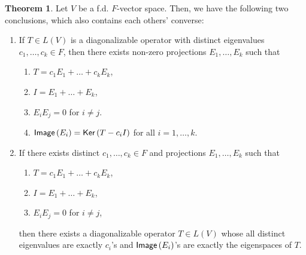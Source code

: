 \documentclass[letterpaper,11pt,twoside]{article}
\theoremstyle{definition}
\theoremstyle{definition}
\newtheorem{theorem}[proposition]{Theorem}
\theoremstyle{definition}
\theoremstyle{definition}
\theoremstyle{definition}
\theoremstyle{definition}
\theoremstyle{remark}
\theoremstyle{definition}
\newcommand{\Ker}[1]{{\fontfamily{lmss}\selectfont 
		\text{Ker}\left (#1\right )
}}
\newcommand{\Image}[1]{{\fontfamily{lmss}\selectfont 
		\text{Image}\left (#1\right )
}}
\begin{document}
    \begin{theorem}\label{T-2.7.2}
    Let $V$ be a f.d. $F$-vector space. Then, we have the following two conclusions, which also contains each others' converse:
    \begin{enumerate}
        \item {If $T\in L(V)$ is a diagonalizable operator with distinct eigenvalues $c_1,\dots,c_k \in F$, then there exists non-zero projections $E_1,\dots, E_k$ such that 
        \begin{enumerate}
            \item {$T= c_1E_1 + \dots +c_kE_k$,}
            \item {$I = E_1+\dots +E_k$,}
            \item {$E_iE_j = 0 $ for $i\neq j$.}
            \item {$\Image{E_i} = \Ker{T-c_iI}$ for all $i=1,\dots,k$.}
        \end{enumerate}
        }
        \item {If there exists distinct $c_1,\dots,c_k\in F$ and projections $E_1,\dots,E_k$ such that 
        \begin{enumerate}
            \item {$T=c_1E_1 + \dots +c_kE_k$,}
            \item{$I=E_1 + \dots +E_k$,}
            \item{$E_iE_j = 0$ for $i\neq j$,}
        \end{enumerate}
        then there exists a diagonalizable operator $T\in L(V)$ whose all distinct eigenvalues are exactly $c_i$'s and $\Image{E_i}$'s are exactly the eigenspaces of $T$.
        }
    \end{enumerate}
    \end{theorem}
\end{document}
